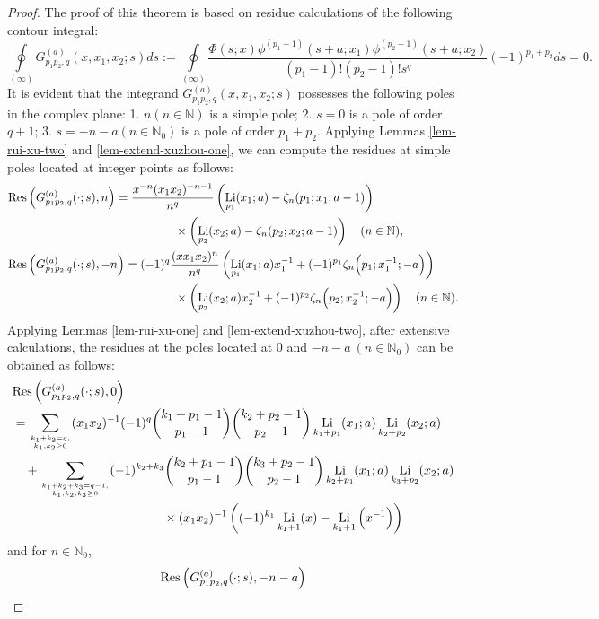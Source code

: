 \documentclass[11pt]{article}
\newcommand\Res{{\rm Res}}
\DeclareMathOperator{\Li}{Li}
\def\N{\mathbb{N}}
\theoremstyle{plain}
\theoremstyle{definition}
\begin{document}
\begin{proof}
The proof of this theorem is based on residue calculations of the following contour integral:
\[\oint\limits_{\left( \infty  \right)}G^{(a)}_{p_1p_2,q}(x,x_1,x_2;s)ds:= \oint\limits_{\left( \infty  \right)}\frac{\Phi(s;x)\phi^{(p_1-1)}(s+a;x_1)\phi^{(p_2-1)}(s+a;x_2)}{(p_1-1)!(p_2-1)!s^q} (-1)^{p_1+p_2}ds=0.\]
It is evident that the integrand $G^{(a)}_{p_1p_2,q}(x,x_1,x_2;s)$ possesses the following poles in the complex plane: 1. $n(n\in\mathbb{N})$ is a simple pole; 2. $s=0$ is a pole of order $q+1$; 3. $s=-n-a(n\in\mathbb{N}_0)$  is a pole of order $p_1+p_2$. Applying Lemmas \ref{lem-rui-xu-two} and \ref{lem-extend-xuzhou-one}, we can compute the residues at simple poles located at integer points as follows:
\begin{align*}
	&\Res\left(G^{(a)}_{p_1p_2,q}(\cdot;s),n\right)=\frac{x^{-n}(x_1x_2)^{-n-1}}{n^q}\left(\Li_{p_1}(x_1;a)-\zeta_n(p_1;x_1;a-1)\right)
	\\&\qquad\qquad\qquad\qquad\qquad\qquad\qquad\times\left(\Li_{p_2}(x_2;a)-\zeta_n(p_2;x_2;a-1)\right)\quad (n\in \N),\\
	&\Res\left(G^{(a)}_{p_1p_2,q}(\cdot;s),-n\right)=(-1)^q \frac{(xx_1x_2)^n}{n^q}\left(\Li_{p_1}(x_1;a)x_1^{-1}+(-1)^{p_1}\zeta_n\Big(p_1;x_1^{-1};-a\Big)\right)\\&\qquad\qquad\qquad\qquad\qquad\qquad\qquad
	\times\left(\Li_{p_2}(x_2;a)x_2^{-1}+(-1)^{p_2}\zeta_n\Big(p_2;x_2^{-1};-a\Big)\right)\quad (n\in \N).
\end{align*}
Applying Lemmas \ref{lem-rui-xu-one} and \ref{lem-extend-xuzhou-two}, after extensive calculations, the residues at the poles located at $0$ and $-n - a\ (n\in \N_0)$ can be obtained as follows:
\begin{align*}
	&\Res\left(G^{(a)}_{p_1p_2,q}(\cdot;s),0\right)\\
	&=\sum_{k_1+k_2=q,\atop k_1,k_2\geq 0}(x_1x_2)^{-1} (-1)^q \binom{k_1+p_1-1}{p_1-1}\binom{k_2+p_2-1}{p_2-1}\Li_{k_1+p_1}(x_1;a)\Li_{k_2+p_2}(x_2;a)\\
	&\quad+\sum_{k_1+k_2+k_3=q-1,\atop k_1,k_2,k_3\geq 0}(-1)^{k_2+k_3}\binom{k_2+p_1-1}{p_1-1}\binom{k_3+p_2-1}{p_2-1}\Li_{k_2+p_1}(x_1;a)\Li_{k_3+p_2}(x_2;a)\nonumber\\&\qquad\qquad\qquad\qquad\qquad\qquad\times(x_1x_2)^{-1} \left((-1)^{k_1}\Li_{{k_1}+1}(x)- \Li_{{k_1}+1}\Big(x^{-1}\Big)\right)
\end{align*}
and for $n\in\N_0$,
\begin{align*}
	&\Res\left(G^{(a)}_{p_1p_2,q}(\cdot;s),-n-a\right)\\

\end{align*}
\end{proof}
\end{document}
